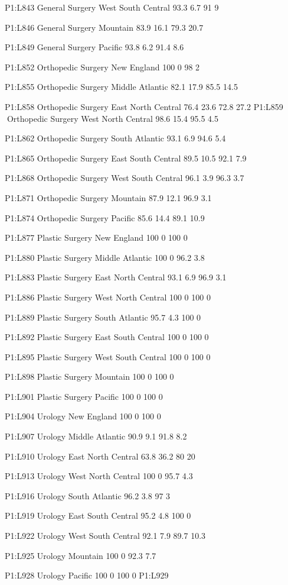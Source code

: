 P1:L843 General Surgery West South Central 93.3 6.7 91 9

P1:L846 General Surgery Mountain 83.9 16.1 79.3 20.7

P1:L849 General Surgery Pacific 93.8 6.2 91.4 8.6

P1:L852 Orthopedic Surgery New England 100 0 98 2

P1:L855 Orthopedic Surgery Middle Atlantic 82.1 17.9 85.5 14.5

P1:L858 Orthopedic Surgery East North Central 76.4 23.6 72.8 27.2
P1:L859 Orthopedic Surgery West North Central 98.6 15.4 95.5 4.5

P1:L862 Orthopedic Surgery South Atlantic 93.1 6.9 94.6 5.4

P1:L865 Orthopedic Surgery East South Central 89.5 10.5 92.1 7.9

P1:L868 Orthopedic Surgery West South Central 96.1 3.9 96.3 3.7

P1:L871 Orthopedic Surgery Mountain 87.9 12.1 96.9 3.1

P1:L874 Orthopedic Surgery Pacific 85.6 14.4 89.1 10.9

P1:L877 Plastic Surgery New England 100 0 100 0

P1:L880 Plastic Surgery Middle Atlantic 100 0 96.2 3.8

P1:L883 Plastic Surgery East North Central 93.1 6.9 96.9 3.1

P1:L886 Plastic Surgery West North Central 100 0 100 0

P1:L889 Plastic Surgery South Atlantic 95.7 4.3 100 0

P1:L892 Plastic Surgery East South Central 100 0 100 0

P1:L895 Plastic Surgery West South Central 100 0 100 0

P1:L898 Plastic Surgery Mountain 100 0 100 0

P1:L901 Plastic Surgery Pacific 100 0 100 0

P1:L904 Urology New England 100 0 100 0

P1:L907 Urology Middle Atlantic 90.9 9.1 91.8 8.2

P1:L910 Urology East North Central 63.8 36.2 80 20

P1:L913 Urology West North Central 100 0 95.7 4.3

P1:L916 Urology South Atlantic 96.2 3.8 97 3

P1:L919 Urology East South Central 95.2 4.8 100 0

P1:L922 Urology West South Central 92.1 7.9 89.7 10.3

P1:L925 Urology Mountain 100 0 92.3 7.7

P1:L928 Urology Pacific 100 0 100 0 P1:L929 
